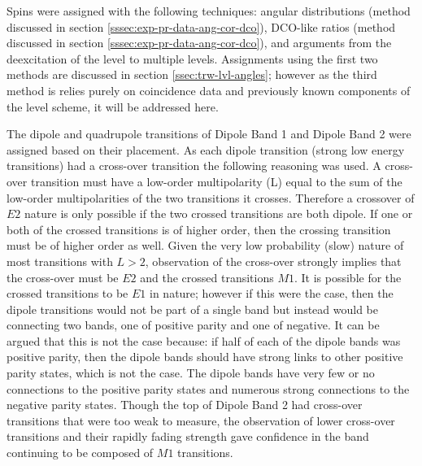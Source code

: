 Spins were assigned with the following techniques: angular distributions (method discussed in section \ref{sssec:exp-pr-data-ang-cor-dco}), DCO-like ratios (method discussed in section \ref{sssec:exp-pr-data-ang-cor-dco}), and arguments from the deexcitation of the level to multiple levels. Assignments using the first two methods are discussed in section \ref{ssec:trw-lvl-angles}; however as the third method is relies purely on coincidence data and previously known components of the level scheme, it will be addressed here.

The dipole and quadrupole transitions of Dipole Band 1 and Dipole Band 2 were assigned based on their placement. As each dipole transition (strong low energy transitions) had a cross-over transition the following reasoning was used. A cross-over transition must have a low-order multipolarity (L) equal to the sum of the low-order multipolarities of the two transitions it crosses. Therefore a crossover of $E2$ nature is only possible if the two crossed transitions are both dipole. If one or both of the crossed transitions is of higher order, then the crossing transition must be of higher order as well. Given the very low probability (slow) nature of most transitions with $L>2$, observation of the cross-over strongly implies that the cross-over must be $E2$ and the crossed transitions $M1$. It is possible for the crossed transitions to be $E1$ in nature; however if this were the case, then the dipole transitions would not be part of a single band but instead would be connecting two bands, one of positive parity and one of negative. It can be argued that this is not the case because: if half of each of the dipole bands was positive parity, then the dipole bands should have strong links to other positive parity states, which is not the case. The dipole bands have very few or no connections to the positive parity states and numerous strong connections to the negative parity states. Though the top of Dipole Band 2 had cross-over transitions that were too weak to measure, the observation of lower cross-over transitions and their rapidly fading strength gave confidence in the band continuing to be composed of $M1$ transitions.

